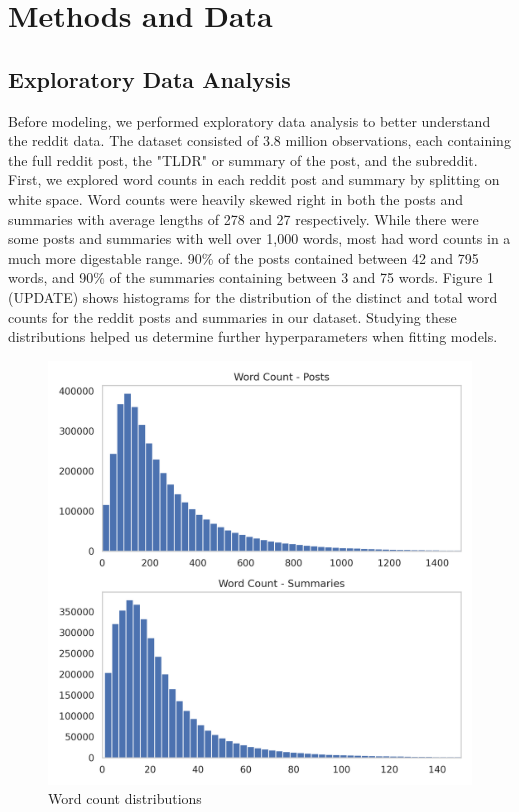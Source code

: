 \documentclass[11pt,a4paper, twocolumn]{article}
\begin{document}
\section{Methods and Data}

\subsection{Exploratory Data Analysis}

Before modeling, we performed exploratory data analysis to better understand the reddit data. 
The dataset consisted of 3.8 million observations, each containing the full reddit post, the "TLDR" or summary of the post, and the subreddit. 
First, we explored word counts in each reddit post and summary by splitting on white space. 
Word counts were heavily skewed right in both the posts and summaries with average lengths of 278 and 27 respectively. 
While there were some posts and summaries with well over 1,000 words, most had word counts in a much more digestable range. 
90\% of the posts contained between 42 and 795 words, and 90\% of the summaries containing between 3 and 75 words. 
Figure 1 (UPDATE) shows histograms for the distribution of the distinct and total word counts for the reddit posts and summaries in our dataset. 
Studying these distributions helped us determine further hyperparameters when fitting models. 


\begin{figure}
  \includegraphics[width=\linewidth]{word_counts2.png}
  \caption{Word count distributions}
  \label{fig:word_counts}
\end{figure}
\end{document}
